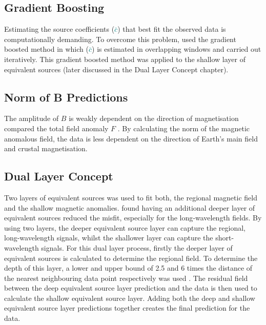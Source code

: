     
\subsection{Gradient Boosting}
Estimating the source coefficients (\textcolor{teal}{$\bar{c}$}) that best fit the observed data is computationally demanding. To overcome this problem, \cite{SolerUieda2021} used the gradient boosted method in which (\textcolor{teal}{$\bar{c}$}) is estimated in overlapping windows and carried out iteratively. This gradient boosted method was applied to the shallow layer of equivalent sources (later discussed in the Dual Layer Concept chapter).

\subsection{Norm of B Predictions}
The amplitude of $B$ is weakly dependent on the direction of magnetisation compared the total field anomaly $F$ \citep{HidalgoGato2021}. By calculating the norm of the magnetic anomalous field, the data is less dependent on the direction of Earth’s main field and crustal magnetisation.

\subsection{Dual Layer Concept}
Two layers of equivalent sources was used to fit both, the regional magnetic field and the shallow magnetic anomalies. \citep{Li2019} found having an additional deeper layer of equivalent sources reduced the misfit, especially for the long‐wavelength fields. By using two layers, the deeper equivalent source layer can capture the regional, long-wavelength signals, whilst the shallower layer can capture the short-wavelength signals. For this dual layer process, firstly the deeper layer of equivalent sources is calculated to determine the regional field. To determine the depth of this layer, a lower and upper bound of 2.5 and 6 times the distance of the nearest neighbouring data point respectively was used \citep{Dampney1969}. The residual field between the deep equivalent source layer prediction and the data is then used to calculate the shallow equivalent source layer. Adding both the deep and shallow equivalent source layer predictions together creates the final prediction for the data.


